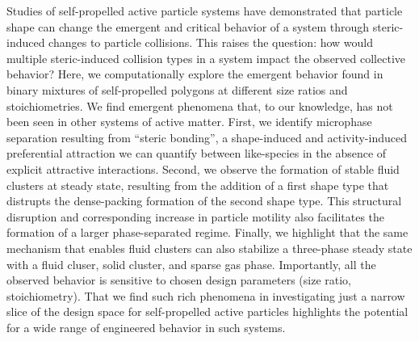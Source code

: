 Studies of self-propelled active particle systems have demonstrated that particle shape can change the emergent and critical behavior of a system through steric-induced changes to particle collisions.
This raises the question: how would multiple steric-induced collision types in a system impact the observed collective behavior?
Here, we computationally explore the emergent behavior found in binary mixtures of self-propelled polygons at different size ratios and stoichiometries.
We find emergent phenomena that, to our knowledge, has not been seen in other systems of active matter.
First, we identify microphase separation resulting from ``steric bonding'', a shape-induced and activity-induced preferential attraction we can quantify between like-species in the absence of explicit attractive interactions.
Second, we observe the formation of stable fluid clusters at steady state, resulting from the addition of a first shape type that distrupts the dense-packing formation of the second shape type.
This structural disruption and corresponding increase in particle motility also facilitates the formation of a larger phase-separated regime.
Finally, we highlight that the same mechanism that enables fluid clusters can also stabilize a three-phase steady state with a fluid cluser, solid cluster, and sparse gas phase.
Importantly, all the observed behavior is sensitive to chosen design parameters (size ratio, stoichiometry).
That we find such rich phenomena in investigating just a narrow slice of the design space for self-propelled active particles highlights the potential for a wide range of engineered behavior in such systems.


